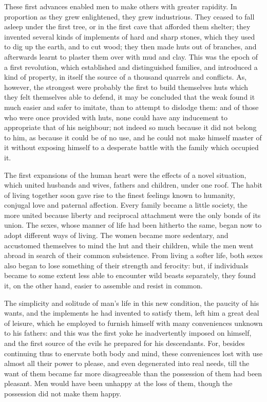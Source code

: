 \documentclass[12pt]{report}
\begin{document}
These first advances enabled men to make others with greater rapidity. In proportion as they grew enlightened, they grew industrious. They ceased to fall asleep under the first tree, or in the first cave that afforded them shelter; they invented several kinds of implements of hard and sharp stones, which they used to dig up the earth, and to cut wood; they then made huts out of branches, and afterwards learnt to plaster them over with mud and clay. This was the epoch of a first revolution, which established and distinguished families, and introduced a kind of property, in itself the source of a thousand quarrels and conflicts. As, however, the strongest were probably the first to build themselves huts which they felt themselves able to defend, it may be concluded that the weak found it much easier and safer to imitate, than to attempt to dislodge them: and of those who were once provided with huts, none could have any inducement to appropriate that of his neighbour; not indeed so much because it did not belong to him, as because it could be of no use, and he could not make himself master of it without exposing himself to a desperate battle with the family which occupied it.

The first expansions of the human heart were the effects of a novel situation, which united husbands and wives, fathers and children, under one roof. The habit of living together soon gave rise to the finest feelings known to humanity, conjugal love and paternal affection. Every family became a little society, the more united because liberty and reciprocal attachment were the only bonds of its union. The sexes, whose manner of life had been hitherto the same, began now to adopt different ways of living. The women became more sedentary, and accustomed themselves to mind the hut and their children, while the men went abroad in search of their common subsistence. From living a softer life, both sexes also began to lose something of their strength and ferocity: but, if individuals became to some extent less able to encounter wild beasts separately, they found it, on the other hand, easier to assemble and resist in common.

The simplicity and solitude of man's life in this new condition, the paucity of his wants, and the implements he had invented to satisfy them, left him a great deal of leisure, which he employed to furnish himself with many conveniences unknown to his fathers: and this was the first yoke he inadvertently imposed on himself, and the first source of the evils he prepared for his descendants. For, besides continuing thus to enervate both body and mind, these conveniences lost with use almost all their power to please, and even degenerated into real needs, till the want of them became far more disagreeable than the possession of them had been pleasant. Men would have been unhappy at the loss of them, though the possession did not make them happy.
\end{document}
